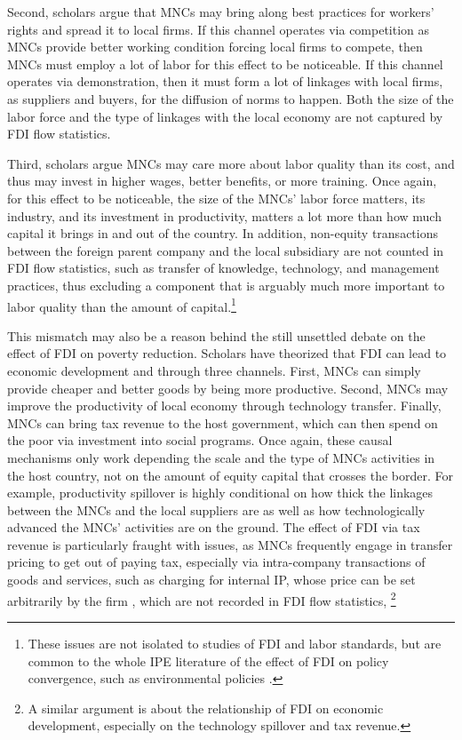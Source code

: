 Second, scholars argue that MNCs may bring along best practices for workers'
rights and spread it to local firms. If this channel operates via competition as
MNCs provide better working condition forcing local firms to compete, then MNCs
must employ a lot of labor for this effect to be noticeable. If this channel
operates via demonstration, then it must form a lot of linkages with local
firms, as suppliers and buyers, for the diffusion of norms to happen. Both the
size of the labor force and the type of linkages with the local economy are not
captured by FDI flow statistics.

Third, scholars argue MNCs may care more about labor quality than its cost, and
thus may invest in higher wages, better benefits, or more training. Once again,
for this effect to be noticeable, the size of the MNCs' labor force matters, its
industry, and its investment in productivity, matters a lot more than how much
capital it brings in and out of the country. In addition, non-equity
transactions between the foreign parent company and the local subsidiary are not
counted in FDI flow statistics, such as transfer of knowledge, technology, and
management practices, thus excluding a component that is arguably much more
important to labor quality than the amount of capital.\footnote{These issues are
not isolated to studies of FDI and labor standards, but are common to the whole
IPE literature of the effect of FDI on policy convergence, such as environmental
policies \citep{Prakash2007}.}

This mismatch may also be a reason behind the still unsettled debate on the
effect of FDI on poverty reduction. Scholars have theorized that FDI can lead to
economic development and through three channels. First, MNCs can simply provide
cheaper and better goods by being more productive. Second, MNCs may improve the
productivity of local economy through technology transfer. Finally, MNCs can
bring tax revenue to the host government, which can then spend on the poor via
investment into social programs. Once again, these causal mechanisms only work
depending the scale and the type of MNCs activities in the host country, not on
the amount of equity capital that crosses the border. For example, productivity
spillover is highly conditional on how thick the linkages between the MNCs and
the local suppliers are as well as how technologically advanced the MNCs'
activities are on the ground. The effect of FDI via tax revenue is particularly
fraught with issues, as MNCs frequently engage in transfer pricing to get out of
paying tax, especially via intra-company transactions of goods and services,
such as charging for internal IP, whose price can be set arbitrarily by the firm
\citep{Malesky2015c}, which are not recorded in FDI flow statistics, \footnote{A
similar argument is about the relationship of FDI on economic development,
especially on the technology spillover and tax revenue.}

